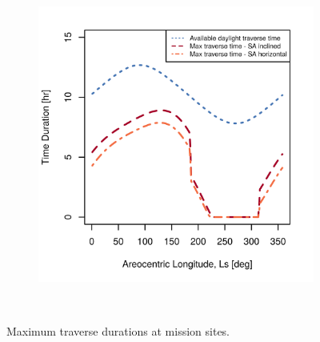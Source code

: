 \begin{figure}[h]
\begin{subfigure}[t]{\subfigureWidth}
        \includegraphics[height=\graphicsHeight]{sections/power-system-design/solar-array/plots/ismeniuscavus-75w-max-traverse-durations-for-solar-cell-coverage-area-24m2.png}
		\label{fig:plot:sub:final-maximum-traverse-durations-ismenius-cavus}
	\end{subfigure}\\[0.8ex]
    \caption[Maximum traverse durations at mission sites]
            {Maximum traverse durations at mission sites.}
    \label{fig:plot:final-maximum-traverse-durations-at-missions-sites}
\vspace{-2ex}
\end{figure}



\clearpage
